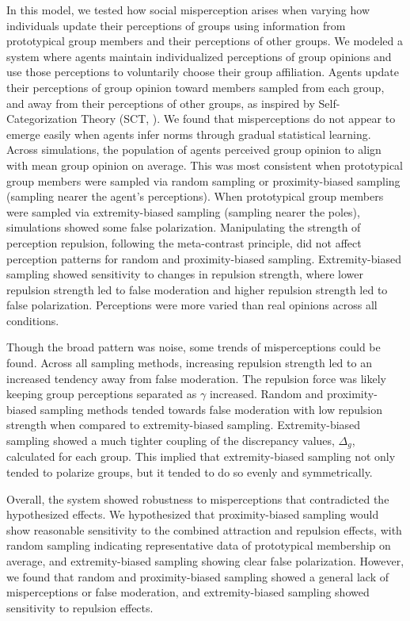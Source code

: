 In this model, we tested how social misperception arises when varying how individuals update their perceptions of groups using information from prototypical group members and their perceptions of other groups. 
We modeled a system where agents maintain individualized perceptions of group opinions and use those perceptions to voluntarily choose their group affiliation. Agents update their perceptions of group opinion toward members sampled from each group, and away from their perceptions of other groups, as inspired by Self-Categorization Theory (SCT, \cite{turner_rediscovering_1987}). We found that misperceptions do not appear to emerge easily when agents infer norms through gradual statistical learning. Across simulations, the population of agents perceived group opinion to align with mean group opinion on average. This was most consistent when prototypical group members were sampled via random sampling or proximity-biased sampling (sampling nearer the agent's perceptions). When prototypical group members were sampled via extremity-biased sampling (sampling nearer the poles), simulations showed some false polarization. Manipulating the strength of perception repulsion, following the meta-contrast principle, did not affect perception patterns for random and proximity-biased sampling. Extremity-biased sampling showed sensitivity to changes in repulsion strength, where lower repulsion strength led to false moderation and higher repulsion strength led to false polarization. Perceptions were more varied than real opinions across all conditions. 

Though the broad pattern was noise, some trends of misperceptions could be found. Across all sampling methods, increasing repulsion strength led to an increased tendency away from false moderation. The repulsion force was likely keeping group perceptions separated as $\gamma$ increased. 
Random and proximity-biased sampling methods tended towards false moderation with low repulsion strength when compared to extremity-biased sampling. Extremity-biased sampling showed a much tighter coupling of the discrepancy values, $\Delta_g$, calculated for each group. This implied that extremity-biased sampling not only tended to polarize groups, but it tended to do so evenly and symmetrically. 

Overall, the system showed robustness to misperceptions that contradicted the hypothesized effects. We hypothesized that proximity-biased sampling would show reasonable sensitivity to the combined attraction and repulsion effects, with random sampling indicating representative data of prototypical membership on average, and extremity-biased sampling showing clear false polarization. However, we found that random and proximity-biased sampling showed a general lack of misperceptions or false moderation, and extremity-biased sampling showed sensitivity to repulsion effects. 

